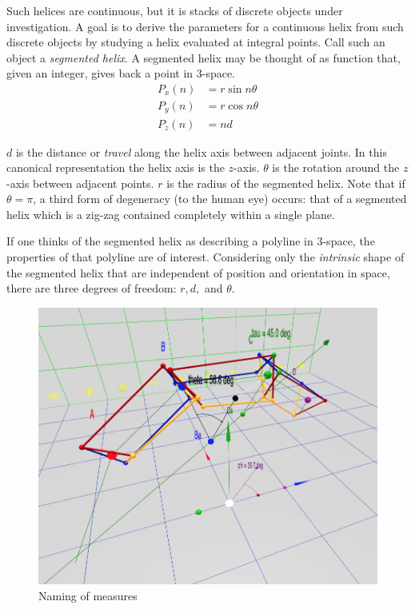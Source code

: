 \documentclass[mathematics,article,submit,pdftex,moreauthors]{Definitions/mdpi}
\begin{document}
Such helices are continuous, but it is stacks of discrete objects under investigation.
A goal is to derive
the parameters for a continuous helix from such discrete objects by studying
a helix evaluated at integral points. Call such an object a {\em segmented helix}.
A segmented helix may be thought of as function that, given an integer, gives back a point in
3-space.
\begin{align}
    P_x(n) &= r \sin{n \theta}  \\
    P_y(n) &= r \cos{n \theta} \\
   P_z(n) &= n d
\end{align}

$d$ is the distance or {\em travel} along the helix axis between adjacent joints. In this canonical representation the helix axis is
the $z$-axis.
$\theta$ is the rotation around the $z$-axis
between adjacent points.
$r$ is the radius of the segmented helix.
Note that if $\theta = \pi$, a third form of degeneracy (to the human eye) occurs:
that of a segmented helix
which is a zig-zag contained completely within a single plane.

If one thinks of the segmented helix as describing a polyline in 3-space,
the properties of that polyline are of interest.
Considering only the {\em intrinsic} shape of the segmented helix that
are independent of position and orientation in space,
there are three degrees
of freedom: $r,d,$ and $\theta$.

\begin{figure}
  \centering
  \captionsetup{justification=centering}
     \includegraphics[width=10 cm]{figures/ABCDFigure.png}
     \caption{Naming of measures}
  \label{fig:naming}
\end{figure}
\unskip
\end{document}
